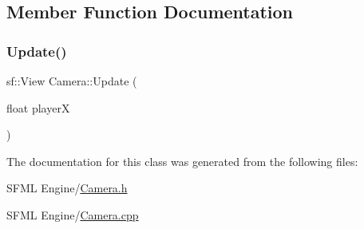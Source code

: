 \subsection{Member Function Documentation}
\mbox{\label{class_camera_a261c43250d32bcc95b26f092225a9d2f}} 
\subsubsection{\texorpdfstring{Update()}{Update()}}
{\footnotesize\ttfamily sf\+::\+View Camera\+::\+Update (\begin{DoxyParamCaption}\item[{float}]{playerX }\end{DoxyParamCaption})}



The documentation for this class was generated from the following files\+:\begin{DoxyCompactItemize}
\item 
S\+F\+M\+L Engine/\hyperlink{_camera_8h}{Camera.\+h}\item 
S\+F\+M\+L Engine/\hyperlink{_camera_8cpp}{Camera.\+cpp}\end{DoxyCompactItemize}
